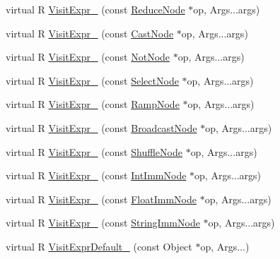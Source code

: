 \begin{DoxyCompactItemize}
virtual R \hyperlink{classtvm_1_1tir_1_1ExprFunctor_3_01R_07const_01PrimExpr_01_6n_00_01Args_8_8_8_08_4_ae374b3e2caed5acf6929ad355fe95750}{Visit\+Expr\+\_\+} (const \hyperlink{classtvm_1_1tir_1_1ReduceNode}{Reduce\+Node} $\ast$op, Args...\+args)
\item 
virtual R \hyperlink{classtvm_1_1tir_1_1ExprFunctor_3_01R_07const_01PrimExpr_01_6n_00_01Args_8_8_8_08_4_ae48ad7065ba759d2f174ae18b8b32125}{Visit\+Expr\+\_\+} (const \hyperlink{classtvm_1_1tir_1_1CastNode}{Cast\+Node} $\ast$op, Args...\+args)
\item 
virtual R \hyperlink{classtvm_1_1tir_1_1ExprFunctor_3_01R_07const_01PrimExpr_01_6n_00_01Args_8_8_8_08_4_af02b3d9e956cc00e87f2c62094441dc0}{Visit\+Expr\+\_\+} (const \hyperlink{classtvm_1_1tir_1_1NotNode}{Not\+Node} $\ast$op, Args...\+args)
\item 
virtual R \hyperlink{classtvm_1_1tir_1_1ExprFunctor_3_01R_07const_01PrimExpr_01_6n_00_01Args_8_8_8_08_4_ac3216a343b01c700daff7f78385adc93}{Visit\+Expr\+\_\+} (const \hyperlink{classtvm_1_1tir_1_1SelectNode}{Select\+Node} $\ast$op, Args...\+args)
\item 
virtual R \hyperlink{classtvm_1_1tir_1_1ExprFunctor_3_01R_07const_01PrimExpr_01_6n_00_01Args_8_8_8_08_4_a01bca11f7768ec4d52aa38ca4550a047}{Visit\+Expr\+\_\+} (const \hyperlink{classtvm_1_1tir_1_1RampNode}{Ramp\+Node} $\ast$op, Args...\+args)
\item 
virtual R \hyperlink{classtvm_1_1tir_1_1ExprFunctor_3_01R_07const_01PrimExpr_01_6n_00_01Args_8_8_8_08_4_aa2ebfb05296f458ccdf74d22f6c5029b}{Visit\+Expr\+\_\+} (const \hyperlink{classtvm_1_1tir_1_1BroadcastNode}{Broadcast\+Node} $\ast$op, Args...\+args)
\item 
virtual R \hyperlink{classtvm_1_1tir_1_1ExprFunctor_3_01R_07const_01PrimExpr_01_6n_00_01Args_8_8_8_08_4_aa469a9ce9483a2d0c66377486d43b101}{Visit\+Expr\+\_\+} (const \hyperlink{classtvm_1_1tir_1_1ShuffleNode}{Shuffle\+Node} $\ast$op, Args...\+args)
\item 
virtual R \hyperlink{classtvm_1_1tir_1_1ExprFunctor_3_01R_07const_01PrimExpr_01_6n_00_01Args_8_8_8_08_4_a5e6b1012aaef749646823af1ff4946c7}{Visit\+Expr\+\_\+} (const \hyperlink{namespacetvm_1_1tir_ae8c7db788e840dc1c2ed1f365d5ea829}{Int\+Imm\+Node} $\ast$op, Args...\+args)
\item 
virtual R \hyperlink{classtvm_1_1tir_1_1ExprFunctor_3_01R_07const_01PrimExpr_01_6n_00_01Args_8_8_8_08_4_ac04267908614379aab07b7ecfc47ee4f}{Visit\+Expr\+\_\+} (const \hyperlink{namespacetvm_1_1tir_adb123be81447d2871f4c716ce2d1dc00}{Float\+Imm\+Node} $\ast$op, Args...\+args)
\item 
virtual R \hyperlink{classtvm_1_1tir_1_1ExprFunctor_3_01R_07const_01PrimExpr_01_6n_00_01Args_8_8_8_08_4_a0a6a6f3bbbb7dcdc9afb4e9a38344df0}{Visit\+Expr\+\_\+} (const \hyperlink{classtvm_1_1tir_1_1StringImmNode}{String\+Imm\+Node} $\ast$op, Args...\+args)
\item 
virtual R \hyperlink{classtvm_1_1tir_1_1ExprFunctor_3_01R_07const_01PrimExpr_01_6n_00_01Args_8_8_8_08_4_abd446c1ab885af47986b4b8c73a1d881}{Visit\+Expr\+Default\+\_\+} (const Object $\ast$op, Args...)
\end{DoxyCompactItemize}


